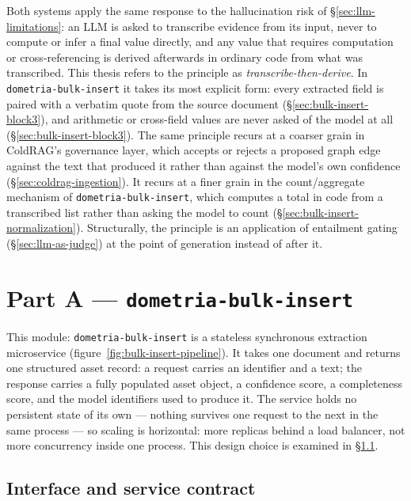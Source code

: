 Both systems apply the same response to the hallucination risk of \S\ref{sec:llm-limitations}: an LLM is asked to transcribe evidence from its input, never to compute or infer a final value directly, and any value that requires computation or cross-referencing is derived afterwards in ordinary code from what was transcribed. This thesis refers to the principle as \emph{transcribe-then-derive}. In \texttt{dometria-bulk-insert} it takes its most explicit form: every extracted field is paired with a verbatim quote from the source document (\S\ref{sec:bulk-insert-block3}), and arithmetic or cross-field values are never asked of the model at all (\S\ref{sec:bulk-insert-block3}). The same principle recurs at a coarser grain in ColdRAG's governance layer, which accepts or rejects a proposed graph edge against the text that produced it rather than against the model's own confidence (\S\ref{sec:coldrag-ingestion}). It recurs at a finer grain in the count/aggregate mechanism of \texttt{dometria-bulk-insert}, which computes a total in code from a transcribed list rather than asking the model to count (\S\ref{sec:bulk-insert-normalization}). Structurally, the principle is an application of entailment gating (\S\ref{sec:llm-as-judge}) at the point of generation instead of after it.

\section{Part A --- \texttt{dometria-bulk-insert}}
\label{sec:bulk-insert}

This module: \texttt{dometria-bulk-insert} is a stateless synchronous extraction microservice (figure~\ref{fig:bulk-insert-pipeline}). It takes one document and returns one structured asset record: a request carries an identifier and a text; the response carries a fully populated asset object, a confidence score, a completeness score, and the model identifiers used to produce it. The service holds no persistent state of its own — nothing survives one request to the next in the same process — so scaling is horizontal: more replicas behind a load balancer, not more concurrency inside one process. This design choice is examined in \S\ref{sec:bulk-insert-api}.

\subsection{Interface and service contract}
\label{sec:bulk-insert-api}

